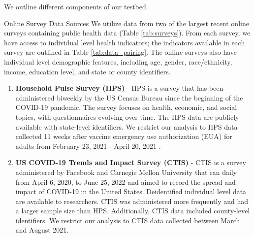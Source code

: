 We outline different components of our testbed.
\begin{subsection}{Online Survey Data Sources}
We utilize data from two of the largest recent online surveys containing public health data (Table \ref{tab:surveys}). From each survey, we have access to individual level health indicators; the indicators available in each survey are outlined in Table \ref{tab:data_pairing}. The online surveys also have individual level demographic features, including age, gender, race/ethnicity, income, education level, and state or county identifiers. 
\begin{enumerate}
\item \textbf{Household Pulse Survey (HPS)} \citep{us2021measuring} - HPS is a survey that has been administered biweekly by the US Census Bureau since the beginning of the COVID-19 pandemic. The survey focuses on health, economic, and social topics, with questionnaires evolving over time. The HPS data are publicly available with state-level identifiers. We restrict our analysis to HPS data collected 11 weeks after vaccine emergency use authorization (EUA) for adults from February 23, 2021 - April 20, 2021 .

\item \textbf{US COVID-19 Trends and Impact Survey (CTIS)} \citep{salomon2021us} - CTIS is a survey administered by Facebook and Carnegie Mellon University that ran daily from April 6, 2020, to June 25, 2022 and aimed to record the spread and impact of COVID-19 in the United States. Deidentified individual level data are available to researchers. CTIS was administered more frequently and had a larger sample size than HPS. Additionally, CTIS data included county-level identifiers. We restrict our analysis to CTIS data collected between March and August 2021.
\end{enumerate}


\end{subsection}
